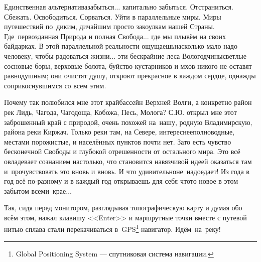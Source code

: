 
Единственная альтернатива\mdash забыться$\ldots$ капитально забыться. Отстраниться. Сбежать. Освободиться. Сорваться. Уйти в параллельные миры. Миры путешествий по~диким, дичайшим просто закоулкам нашей Страны. Где~первозданная Природа и полная Свобода$\ldots$ где мы плывём на своих байдарках. В этой параллельной реальности ощущаешь\mdash насколько мало надо человеку, чтобы радоваться жизни$\ldots$ эти бескрайние леса Вологодчины\mdash светлые сосновые боры, верховые болота, буйство кустарников и мхов никого не оставят равнодушным; они очистят душу, откроют прекрасное в каждом сердце, однажды соприкоснувшимся со всем этим. 

Почему так полюбился мне этот край\mdash бассейн Верхней Волги, а конкретно район рек Лидь, Чагода, Чагодоща, Кобожа, Песь, Молога? С.Ю. открыл мне этот заброшенный край с природой, очень похожей на~нашу, родную Владимирскую, района реки Киржач. Только реки там, на Севере, интереснее\mdash полноводные, местами порожистые, и населённых пунктов почти нет. Зато есть чувство бесконечной Свободы и глубокой отрешенности от остального мира. Это всё овладевает сознанием настолько, что становится навязчивой идеей оказаться там и~прочувствовать это вновь и вновь. И что удивительно\mdash не~надоедает! Из года в год всё по-разному и в каждый год открываешь для себя что\sdash то новое в этом забытом всеми~крае$\ldots$
 
Так, сидя перед монитором, разглядывая топографическую карту и думая обо всём этом, 
нажал клавишу <<Enter>> и маршрутные точки вместе с путевой нитью сплава стали перекачиваться в~GPS\footnote{Global Positioning System --- спутниковая система навигации.} навигатор. Идём~на~реку!%

\begin{center}
\end{center}
